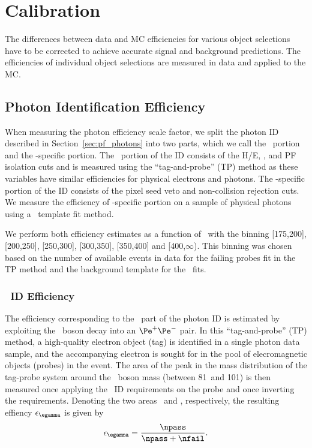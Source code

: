 \chapter{Calibration}
\label{chap:calibration}

The differences between data and MC efficiencies for various object selections have to be corrected to achieve accurate signal and background predictions.
The efficiencies of individual object selections are measured in data and applied to the MC.

\section{Photon Identification Efficiency}
\label{sec:photoneff}

When measuring the photon efficiency scale factor, we split the photon ID described in Section~\ref{sec:pf_photons} into two parts, which we call the \egamma\ portion and the \Pgg-specific portion. 
The \egamma\ portion of the ID consists of the H/E, \sieie, and PF isolation cuts and is measured using the ``tag-and-probe'' (TP) method as these variables have similar efficiencies for physical electrons and photons. 
The \Pgg-specific portion of the ID consists of the pixel seed veto and non-collision rejection cuts.
We measure the efficiency of \Pgg-specific portion on a sample of physical photons using a \sieie\ template fit method.

We perform both efficiency estimates as a function of \pt\ with the binning [175,200], [200,250], [250,300], [300,350], [350,400] and [400,$\infty$). 
This binning was chosen based on the number of available events in data for the failing probes fit in the TP method and the background template for the \sieie\ fits.

\subsection{\egamma\ ID Efficiency}
\label{sec:idsf}

The efficiency corresponding to the \egamma\ part of the photon ID is estimated by exploiting the \PZ\ boson decay into an $\Pe^{+}\Pe^{-}$ pair. 
In this ``tag-and-probe'' (TP) method, a high-quality electron object (tag) is identified in a single photon data sample, and the accompanying electron is sought for in the pool of elecromagnetic objects (probes) in the event. 
The area of the peak in the mass distribution of the tag-probe system around the \PZ\ boson mass (between 81\GeV\ and 101\GeV) is then measured once applying the \Pe\Pgg\ ID requirements on the probe and once inverting the requirements. 
Denoting the two areas \npass\ and \nfail, respectively, the resulting effiency $\epsilon_{\egamma}$ is given by
\begin{equation}
\epsilon_{\egamma} = \frac{\npass}{\npass + \nfail}.
\end{equation}

